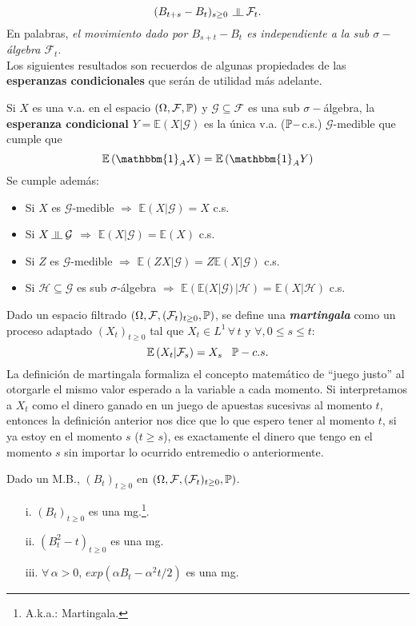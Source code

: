 \[(B_{t+s} - B_t)_{s\geq0}\,\indep \mathcal{F}_t.\]
En palabras, \textit{el movimiento dado por $B_{s+t}-B_t$ es independiente a la sub $\sigma-$álgebra $\mathcal{F}_t$}.\\\break
Los siguientes resultados son recuerdos de algunas propiedades de las \textbf{esperanzas condicionales} que serán de utilidad más adelante.
\begin{prop}
Si $X$ es una v.a. en el espacio $(\Omega,\mathcal{F},\mathbb{P})$ y  $\mathcal{G}\subseteq \mathcal{F}$ es una sub $\sigma-$álgebra, la \textbf{esperanza condicional} $Y=\mathbb{E}\left(X|\mathcal{G}\right)$ es la única v.a. ($\mathbb{P}-$c.s.) $\mathcal{G}$-medible que cumple que
\[\mathbb{E}\left(\mathbbm{1}_AX\right) = \mathbb{E}\left(\mathbbm{1}_AY\right)\]
\newline
Se cumple además:
\begin{itemize}
    \item Si $X$ es $\mathcal{G}$-medible $\Rightarrow$ $\mathbb{E}\left(X|\mathcal{G}\right) = X$ c.s.
    \item Si $X \indep \mathcal{G}$ $\Rightarrow$ $\mathbb{E}(X|\mathcal{G}) = \mathbb{E}(X)$ c.s.
    \item Si $Z$ es $\mathcal{G}$-medible $\Rightarrow$ $\mathbb{E}(ZX|\mathcal{G}) = Z\mathbb{E}(X|\mathcal{G})$ c.s.
    \item Si $\mathcal{H}\subseteq \mathcal{G}$ es sub $\sigma$-álgebra $\Rightarrow$ $\mathbb{E}\left(\mathbb{E}(X|\mathcal{G})\,|\mathcal{H}\right) = \mathbb{E}(X|\mathcal{H})$ c.s.
\end{itemize}
\label{prop-espcondicional}
\end{prop}

Dado un espacio filtrado $(\Omega,\mathcal{F},(\mathcal{F}_t)_{t\geq0},\mathbb{P})$, se define una \textbf{\textit{martingala}} como un proceso adaptado $(X_t)_{t\geq0}$ tal que $X_t \in L^1\,\forall\,t$ y $\forall,0\leq s\leq t$:
\[\mathbb{E}\left(X_t|\mathcal{F}_s\right) = X_s\hspace{0.3cm}\mathbb{P}-c.s.\]
La definición de martingala formaliza el concepto matemático de ``juego justo'' al otorgarle el mismo valor esperado a la variable a cada momento. Si interpretamos a $X_t$ como el dinero ganado en un juego de apuestas sucesivas al momento $t$, entonces la definición anterior nos dice que lo que espero tener al momento $t$, si ya estoy en el momento $s$ ($t\geq s$), es exactamente el dinero que tengo en el momento $s$ sin importar lo ocurrido entremedio o anteriormente.
\newpage
\begin{prop}
Dado un M.B., $(B_t)_{t\geq0}$ en $(\Omega,\mathcal{F},(\mathcal{F}_t)_{t\geq0},\mathbb{P})$.
\begin{itemize}
    \item[i.] $(B_t)_{t\geq0}$ es una mg.\footnote{A.k.a.: Martingala.}.
    \item[ii.] $(B_t^2 - t)_{t\geq0}$ es una mg.
    \item[iii.] $\forall\,\alpha>0$, $exp\left(\alpha B_t - \alpha^2 t/2\right)$ es una mg.
\end{itemize}
\label{prop_martingalasMB}
\end{prop}

